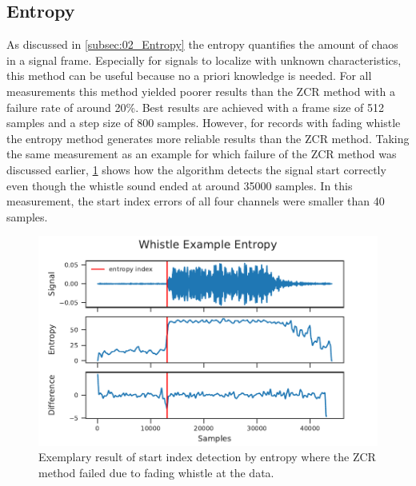 \subsection{Entropy}
\label{subsec:04_entropy}

As discussed in \cref{subsec:02_Entropy} the entropy quantifies the amount
of chaos in a signal frame.
Especially for signals to localize with unknown characteristics,
this method can be useful because no a priori knowledge is needed.
For all measurements this method yielded poorer results than the \ac{ZCR} method
with a failure rate of around 20\si{\percent}.
Best results are achieved with a frame size of 512 samples and a step size of 800
samples.
However, for records with fading whistle the entropy method
generates more reliable results than the \ac{ZCR} method.
Taking the same measurement as an example for which failure of the \ac{ZCR} method
was discussed earlier, \cref{fig:04_entropyGood} shows how the algorithm
detects the signal start correctly even though the whistle sound ended at
around 35000 samples. In this measurement, the start index errors of all four
channels were smaller than 40 samples.
\begin{figure}[ht]
	\centering
	\includegraphics[]{figures/evaluation/entropy_good}
	\caption{Exemplary result of start index detection by entropy where
			the \ac{ZCR} method failed due to fading whistle
			at the data.}
	\label{fig:04_entropyGood}
\end{figure}

